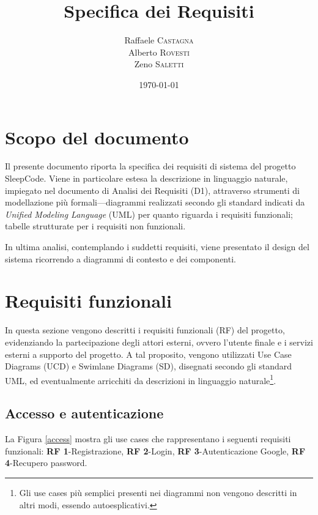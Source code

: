 \documentclass[11pt, a4paper]{article}
\title{Specifica dei Requisiti}
\author{Raffaele \textsc{Castagna}\\
Alberto \textsc{Rovesti}\\
Zeno \textsc{Saletti}}
\date{\today}
\theoremstyle{definition} %
\begin{document}


\tableofcontents

\afterpage{\cfoot{\thepage}}
\newpage
\section*{Scopo del documento}
Il presente documento riporta la specifica dei requisiti di sistema
del progetto SleepCode. Viene in particolare estesa la descrizione
in linguaggio naturale, impiegato nel documento di Analisi dei Requisiti
(D1), attraverso strumenti di modellazione più formali—diagrammi
realizzati secondo gli standard indicati da \textit{Unified Modeling Language}
(UML) per quanto riguarda i requisiti funzionali; tabelle strutturate
per i requisiti non funzionali.

In ultima analisi, contemplando i suddetti requisiti, viene presentato il
design del sistema ricorrendo a diagrammi di contesto e dei componenti.


\newpage
\section{Requisiti funzionali}
In questa sezione vengono descritti i requisiti funzionali (RF) del
progetto, evidenziando la partecipazione degli attori esterni, ovvero
l'utente finale e i servizi esterni a supporto del progetto. A tal
proposito, vengono utilizzati Use Case Diagrams (UCD) e Swimlane Diagrams (SD),
disegnati secondo gli standard UML, ed eventualmente arricchiti da
descrizioni in linguaggio naturale\footnote{Gli use cases più semplici
presenti nei diagrammi non vengono descritti in altri modi, essendo
autoesplicativi.}.

\subsection{Accesso e autenticazione}
La Figura \ref{access} mostra gli use cases che rappresentano i seguenti
requisiti funzionali: \textbf{RF 1}-Registrazione,
\textbf{RF 2}-Login, \textbf{RF 3}-Autenticazione Google, \textbf{RF 4}-Recupero
password.
\end{document}
